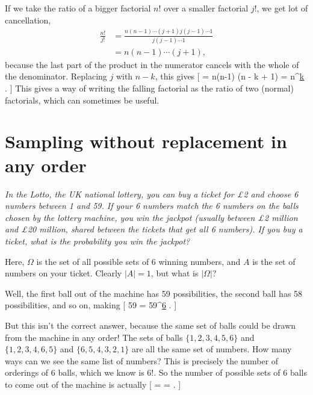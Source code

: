 \documentclass[
  letterpaper,
]{report}
\theoremstyle{definition}
\theoremstyle{definition}
\theoremstyle{remark}
\begin{document}
If we take the ratio of a bigger factorial \(n!\) over a smaller
factorial \(j!\), we get lot of cancellation, \begin{align*}
\frac{n!}{j!} &= \frac{n(n-1) \cdots(j+1)j(j-1) \cdots 1}{j(j-1) \cdots 1} \\
  &= n(n-1) \cdots (j+1) ,
\end{align*} because the last part of the product in the numerator
cancels with the whole of the denominator. Replacing \(j\) with \(n-k\),
this gives {[}  = n(n-1) \cdots (n - k + 1) =
{n}^{\underline{k}} . {]} This gives a way of writing the falling
factorial as the ratio of two (normal) factorials, which can sometimes
be useful.

\hypertarget{combinations}{%
\section{Sampling without replacement in any order}\label{combinations}}

\leavevmode{}%
\emph{In the Lotto, the UK national lottery, you can buy a ticket for £2
and choose 6 numbers between 1 and 59. If your 6 numbers match the 6
numbers on the balls chosen by the lottery machine, you win the jackpot
(usually between £2 million and £20 million, shared between the tickets
that get all 6 numbers). If you buy a ticket, what is the probability
you win the jackpot?}

Here, \(\Omega\) is the set of all possible sets of 6 winning numbers,
and \(A\) is the set of numbers on your ticket. Clearly \(|A| = 1\), but
what is \(|\Omega|\)?

Well, the first ball out of the machine has 59 possibilities, the second
ball has 58 possibilities, and so on, making {[} 59  
   = {59}^{\underline{6}} . {]}

But this isn't the correct answer, because the same set of balls could
be drawn from the machine in any order! The sets of balls
\(\{1,2,3,4,5,6\}\) and \(\{1,2,3,4,6,5\}\) and \(\{6,5,4,3,2,1\}\) are
all the same set of numbers. How many ways can we see the same list of
numbers? This is precisely the number of orderings of 6 balls, which we
know is \(6!\). So the number of possible sets of 6 balls to come out of
the machine is actually {[}  =
 =
  . {]}
\end{document}
